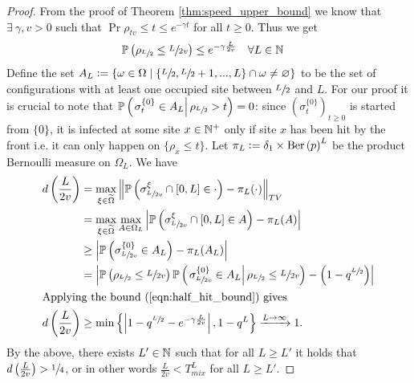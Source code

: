 \begin{proof}
From the proof of Theorem \ref{thm:speed_upper_bound} we know that $\exists\ \gamma, v > 0$ such that $\Pr{\rho_{tv} \leq t} \leq e^{- \gamma t}$ for all $ t \geq 0$. Thus we get
\begin{align}
\mathbb{P} \left( \rho_{\sfrac{L}{2}} \leq \sfrac{L}{2v} \right) &\leq e^{- \gamma \frac{L}{2v}} &&\forall L \in \mathbb{N} \label{eqn:half_hit_bound}
\end{align}
Define the set $A_L \vcentcolon= \{\omega \in \Omega \mid \{\sfrac{L}{2}, \sfrac{L}{2} + 1, ..., L\} \cap \omega \neq \varnothing\}$ to be the set of configurations with at least one occupied site between $\sfrac{L}{2}$ and $L$. For our proof it is crucial to note that $\mathbb{P} \left( \left. \sigma^{\{0\}}_t \in A_L \right| \rho_{\sfrac{L}{2}} > t \right) = 0$: since $(\sigma^{\{0\}}_t)_{t \geq 0}$ is started from $\{0\}$, it is infected at some site $x \in \mathbb{N}^+$ only if site $x$ has been hit by the front i.e. it can only happen on $\{ \rho_x \leq t \}$. Let $\pi_L \vcentcolon= \delta_1 \times \text{Ber} \left( p \right)^L$ be the product Bernoulli measure on $\Omega_L$. We have
\begin{align*}
d\left(\frac{L}{2v}\right) &= \max\limits_{\xi \in \widetilde{\Omega}} \left\Vert \mathbb{P} \left( \sigma^\xi_{\sfrac{L}{2v}} \cap [0,L] \in \cdot \right) - \pi_L(\cdot)								   \right\Vert_{TV} \\
						   &= \max\limits_{\xi \in \widetilde{\Omega}} \max\limits_{A \in \Omega_L} \left| \mathbb{P} \left( \sigma^\xi_{\sfrac{L}{2v}} \cap [0,L] \in A \right) - \pi_L(A) \right|\\
						   &\geq \left| \mathbb{P} \left( \sigma^{\{0\}}_{\sfrac{L}{2v}} \in A_L \right) - \pi_L(A_L) \right| \\
						   &= \left| \mathbb{P} \left( \rho_{\sfrac{L}{2}} \leq \sfrac{L}{2v} \right)\mathbb{P} \left( \left. \sigma^{\{0\}}_{\sfrac{L}{2v}} \in A_L \right| \rho_{\sfrac{L}{2}} \leq \sfrac{L}{2v} \right)  - \left( 1 - q^{\sfrac{L}{2}} \right) \right| \\
						   \intertext{Applying the bound (\ref{eqn:half_hit_bound}) gives}
d\left(\frac{L}{2v}\right) &\geq \min\left\{ \left| 1 - q^{\sfrac{L}{2}} - e^{- \gamma \frac{L}{2v}} \right|,  1 - q^L\right\} \xrightarrow{L \rightarrow \infty} 1. 
\end{align*}
By the above, there exists $L' \in \mathbb{N}$ such that for all $L \geq L'$ it holds that $d\left(\frac{L}{2v}\right) > \sfrac{1}{4}$, or in other words $\frac{L}{2v} < T^L_{mix}$ for all $L \geq L'$.
\end{proof}



